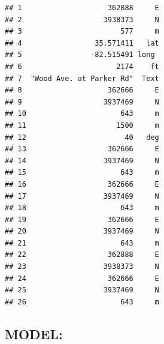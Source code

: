 \documentclass[
]{article}
\begin{document}
\begin{verbatim}
## 1                    362888     E
## 2                   3938373     N
## 3                       577     m
## 4                 35.571411   lat
## 5                -82.515491 long 
## 6                      2174    ft
## 7  "Wood Ave. at Parker Rd"  Text
## 8                    362666     E
## 9                   3937469     N
## 10                      643     m
## 11                     1500     m
## 12                       40   deg
## 13                   362666     E
## 14                  3937469     N
## 15                      643     m
## 16                   362666     E
## 17                  3937469     N
## 18                      643     m
## 19                   362666     E
## 20                  3937469     N
## 21                      643     m
## 22                   362888     E
## 23                  3938373     N
## 24                   362666     E
## 25                  3937469     N
## 26                      643     m
\end{verbatim}

\hypertarget{model}{%
\subsection{MODEL:}\label{model}}
\end{document}
